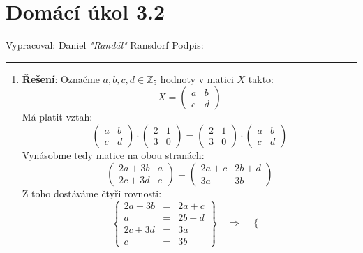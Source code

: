 \documentclass[12pt]{article}
\begin{document}
\section*{Domácí úkol 3.2}

Vypracoval: Daniel \textit{"Randál"} Ransdorf \hfill Podpis: \rule{4cm}{0.4pt}

\begin{enumerate}
  \item \textbf{Řešení}:
    Označme $a,b,c,d \in \mathbb{Z}_5$ hodnoty v matici $X$ takto:
    \[
      X = \left(\begin{array}{cc}
        a & b \\
        c & d
      \end{array}\right)
    \]
    Má platit vztah:
    \[
      \left(\begin{array}{cc}
        a & b \\
        c & d
      \end{array}\right) \cdot
      \left(\begin{array}{cc}
        2 & 1 \\
        3 & 0
      \end{array}\right) = 
      \left(\begin{array}{cc}
        2 & 1 \\
        3 & 0
      \end{array}\right) \cdot
      \left(\begin{array}{cc}
        a & b \\
        c & d
      \end{array}\right)
    \]
    Vynásobme tedy matice na obou stranách:
    \[
      \left(\begin{array}{cc}
        2a+3b & a \\
        2c+3d & c
      \end{array}\right) = 
      \left(\begin{array}{cc}
        2a+c & 2b+d \\
        3a & 3b
      \end{array}\right) 
    \]
    Z toho dostáváme čtyři rovnosti:
    \[
      \left\{
      \begin{array}{rcl}
      2a+3b&=&2a+c \\
      a&=&2b+d \\
      2c+3d&=&3a \\
      c&=&3b
      \end{array}
      \right\}
      \quad \Longrightarrow \quad
      \left\{
      \begin{array}{rcl}

\end{array}\]
\end{enumerate}
\end{document}
